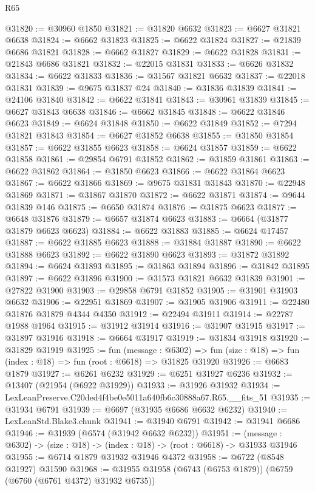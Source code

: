 \begin{lexlean}{R65}
\begin{coremodule}
{@31820 := @30960 @1850
@31821 := @31820 @6632
@31823 := @6627 @31821 @6638
@31824 := @6662 @31823
@31825 := @6622 @31824
@31827 := @21839 @6686 @31821
@31828 := @6662 @31827
@31829 := @6622 @31828
@31831 := @21843 @6686 @31821
@31832 := @22015 @31831
@31833 := @6626 @31832
@31834 := @6622 @31833
@31836 := @31567 @31821 @6632
@31837 := @22018 @31831
@31839 := @9675 @31837 @24
@31840 := @31836 @31839
@31841 := @24106 @31840
@31842 := @6622 @31841
@31843 := @30961 @31839
@31845 := @6627 @31843 @6638
@31846 := @6662 @31845
@31848 := @6622 @31846 @6623
@31849 := @6624 @31848
@31850 := @6622 @31849
@31852 := @7294 @31821 @31843
@31854 := @6627 @31852 @6638
@31855 := @31850 @31854
@31857 := @6622 @31855 @6623
@31858 := @6624 @31857
@31859 := @6622 @31858
@31861 := @29854 @6791 @31852
@31862 := @31859 @31861
@31863 := @6622 @31862
@31864 := @31850 @6623
@31866 := @6622 @31864 @6623
@31867 := @6622 @31866
@31869 := @9675 @31831 @31843
@31870 := @22948 @31869
@31871 := @31867 @31870
@31872 := @6622 @31871
@31874 := @9644 @31839 @146
@31875 := @6650 @31874
@31876 := @31875 @6623
@31877 := @6648 @31876
@31879 := @6657 @31874 @6623
@31883 := @6664 (@31877 @31879 @6623 @6623)
@31884 := @6622 @31883
@31885 := @6624 @17457
@31887 := @6622 @31885 @6623
@31888 := @31884 @31887
@31890 := @6622 @31888 @6623
@31892 := @6622 @31890 @6623
@31893 := @31872 @31892
@31894 := @6624 @31893
@31895 := @31863 @31894
@31896 := @31842 @31895
@31897 := @6622 @31896
@31900 := @31573 @31821 @6632 @31839
@31901 := @27822 @31900
@31903 := @29858 @6791 @31852
@31905 := @31901 @31903 @6632
@31906 := @22951 @31869
@31907 := @31905 @31906
@31911 := @22480 @31876 @31879 @4344 @4350
@31912 := @22494 @31911
@31914 := @22787 @1988 @1964
@31915 := @31912 @31914
@31916 := @31907 @31915
@31917 := @31897 @31916
@31918 := @6664 @31917
@31919 := @31834 @31918
@31920 := @31829 @31919
@31925 := fun (message : @6302) =>
  fun (size : @18) => fun (index : @18) => fun (root : @6618) => @31825 @31920
@31926 := @6683 @1879
@31927 := @6261 @6232
@31929 := @6251 @31927 @6236
@31932 := @13407 (@21954 (@6922 @31929))
@31933 := @31926 @31932
@31934 := LexLeanPreserve.C20ded4f4be0e5011a640fb6c30888a67.R65.__fits_51
@31935 := @31934 @6791
@31939 := @6697 (@31935 @6686 @6632 @6232)
@31940 := LexLeanStd.Blake3.chunk
@31941 := @31940 @6791
@31942 := @31941 @6686
@31946 := @31939 (@6574 (@31942 @6632 @6232))
@31951 := (message : @6302) -> (size : @18) -> (index : @18) -> (root : @6618) -> @31933 @31946
@31955 := @6714 @1879 @31932 @31946 @4372
@31958 := @6722 (@8548 @31927) @31590
@31968 := @31955 @31958 (@6743 (@6753 @1879)) (@6759 (@6760 (@6761 @4372) @31932 @6735))
}
\end{coremodule}
\end{lexlean}
